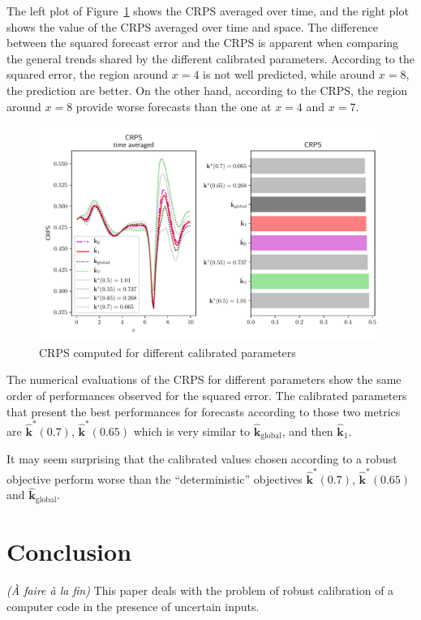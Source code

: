 \documentclass[preprint, 1p]{elsarticle}
\newcommand{\kest}{\hat{\mathbf{k}}}
\newcommand{\victor}[1]{{\itshape\color{green} ({#1})}}
\begin{document}
The left plot of Figure~\ref{fig:forecast_crps} shows the CRPS averaged over time, and the right plot shows the value of the CRPS averaged over time and space. The difference between the squared forecast error and the CRPS is apparent when comparing the general trends shared by the different calibrated parameters. According to the squared error, the region around $x=4$ is not well predicted, while around $x=8$, the prediction are better. On the other hand, according to the CRPS, the region around $x=8$ provide worse forecasts than the one at $x=4$ and $x=7$. 

\begin{figure}[!h]
  \centering
  \includegraphics[width=.9\textwidth]{Figures/CRPS_full}
  \caption{CRPS computed for different calibrated parameters}
\label{fig:forecast_crps}
\end{figure}
The numerical evaluations of the CRPS for different parameters show the same order of performances observed for the squared error.
The calibrated parameters that present the best performances for forecasts according to those two metrics are $\kest^*(0.7)$, $\kest^*(0.65)$ which is very similar to $\kest_{\mathrm{global}}$, and then $\kest_1$.

It may seem surprising that the calibrated values chosen according to a robust objective perform worse than the ``deterministic'' objectives $\kest^*(0.7)$, $\kest^*(0.65)$ and $\kest_{\mathrm{global}}$. 


\clearpage

\section*{Conclusion}  
\victor{À faire à la fin}
This paper deals with the problem of robust calibration of a computer code in the presence of uncertain inputs. 
\end{document}
